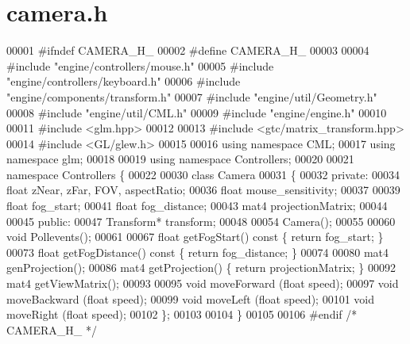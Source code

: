 \section{camera.\+h}
\label{camera_8h_source}

\begin{DoxyCode}
00001 \textcolor{preprocessor}{#ifndef CAMERA\_H\_}
00002 \textcolor{preprocessor}{#define CAMERA\_H\_}
00003 
00004 \textcolor{preprocessor}{#include "engine/controllers/mouse.h"}
00005 \textcolor{preprocessor}{#include "engine/controllers/keyboard.h"}
00006 \textcolor{preprocessor}{#include "engine/components/transform.h"}
00007 \textcolor{preprocessor}{#include "engine/util/Geometry.h"}
00008 \textcolor{preprocessor}{#include "engine/util/CML.h"}
00009 \textcolor{preprocessor}{#include "engine/engine.h"}
00010 
00011 \textcolor{preprocessor}{#include <glm.hpp>}
00012 
00013 \textcolor{preprocessor}{#include <gtc/matrix\_transform.hpp>}
00014 \textcolor{preprocessor}{#include <GL/glew.h>}
00015 
00016 \textcolor{keyword}{using namespace }CML;
00017 \textcolor{keyword}{using namespace }glm;
00018 
00019 \textcolor{keyword}{using namespace }Controllers;
00020 
00021 \textcolor{keyword}{namespace }Controllers \{
00022 
00030     \textcolor{keyword}{class }Camera
00031     \{
00032     \textcolor{keyword}{private}:
00034         \textcolor{keywordtype}{float}     zNear, zFar, FOV, aspectRatio;
00036         \textcolor{keywordtype}{float}     mouse\_sensitivity;
00037 
00039         \textcolor{keywordtype}{float}     fog\_start;
00041         \textcolor{keywordtype}{float}     fog\_distance;
00043         mat4 projectionMatrix;
00044 
00045     \textcolor{keyword}{public}:
00047         Transform* transform;
00048 
00054         Camera();
00055 
00060         \textcolor{keywordtype}{void} Pollevents();
00061 
00067         \textcolor{keywordtype}{float} getFogStart()\textcolor{keyword}{    const }\{ \textcolor{keywordflow}{return} fog\_start; \}
00073         \textcolor{keywordtype}{float} getFogDistance()\textcolor{keyword}{ const }\{ \textcolor{keywordflow}{return} fog\_distance; \}
00074 
00080         mat4 genProjection();
00086         mat4 getProjection() \{ \textcolor{keywordflow}{return} projectionMatrix; \}
00092         mat4 getViewMatrix();
00093 
00095         \textcolor{keywordtype}{void} moveForward    (\textcolor{keywordtype}{float} speed);
00097         \textcolor{keywordtype}{void} moveBackward   (\textcolor{keywordtype}{float} speed);
00099         \textcolor{keywordtype}{void} moveLeft       (\textcolor{keywordtype}{float} speed);
00101         \textcolor{keywordtype}{void} moveRight      (\textcolor{keywordtype}{float} speed);
00102     \};
00103 
00104 \}
00105 
00106 \textcolor{preprocessor}{#endif }\textcolor{comment}{/* CAMERA\_H\_ */}\textcolor{preprocessor}{}
\end{DoxyCode}

